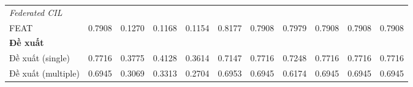 \begin{table}[H]
{\begin{tabular}{lcccccccccc}
        \hline
        \multicolumn{11}{l}{\textit{Federated CIL}} \\
        FEAT & \cellcolor{green!60!black}0.7908 & 0.1270 & 0.1168 & 0.1154 & \cellcolor{green!60!black}0.8177 & \cellcolor{green!60!black}0.7908 & \cellcolor{green!60!black}0.7979 & \cellcolor{green!60!black}0.7908 & \cellcolor{green!60!black}0.7908 & \cellcolor{green!60!black}0.7908 \\
        \hline
        \multicolumn{11}{l}{\textbf{Đề xuất}} \\
        Đề xuất (single) & \cellcolor{green!30}0.7716 & \cellcolor{green!60!black}0.3775 & \cellcolor{green!60!black}0.4128 & \cellcolor{green!60!black}0.3614 & \cellcolor{green!90!black}0.7147 & \cellcolor{green!30}0.7716 & \cellcolor{green!90!black}0.7248 & \cellcolor{green!30}0.7716 & \cellcolor{green!30}0.7716 & \cellcolor{green!30}0.7716 \\
        Đề xuất (multiple) & 0.6945 & \cellcolor{green!90!black}0.3069 & 0.3313 & \cellcolor{green!30}0.2704 & \cellcolor{green!30}0.6953 & 0.6945 & 0.6174 & 0.6945 & 0.6945 & 0.6945 \\
        \hline
    \end{tabular}}
\end{table}

